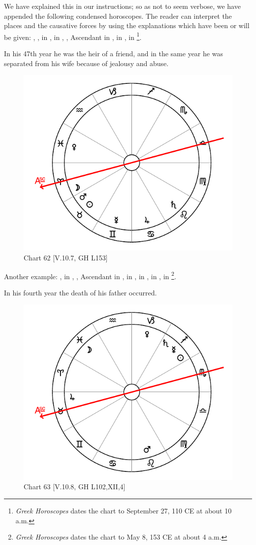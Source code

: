 \noindent We have explained this in our instructions; so as not to seem verbose, we have appended the following condensed horoscopes. The reader can interpret the places and the causative forces by using the
explanations which have been or will be given: \Sun, \Mercury, \Venus \xspace in \Libra, \Saturn\xspace in \Aquarius, \Jupiter, Ascendant in \Sagittarius, \Mars\xspace in \Virgo, \Moon in \Leo\footnote{\textit{Greek Horoscopes} dates the chart to September 27, 110 CE at about 10 a.m.}. 

In his 47th year he was the heir of a friend, and in the same year he was separated from his wife because of jealousy and abuse.

\begin{figure}
\centering
\vspace{-20pt}
\includegraphics[width=.68\textwidth]{charts/5_10_07}
\caption{Chart 62 [V.10.7, GH L153]}
\label{fig:chart62}
\end{figure}

\noindent Another example: \Sun, \Mars\xspace in \Taurus, \Moon, Ascendant in \Aries, \Saturn\xspace in \Leo, \Jupiter\xspace in \Cancer, \Venus\xspace in \Pisces, \Mercury\xspace in \Gemini\footnote{\textit{Greek Horoscopes} dates the chart to May 8, 153 CE at about 4 a.m.}. 

In his fourth year the death of his father occurred.

\vspace{1.2cm}

\begin{figure}
\centering
\vspace{-20pt}
\includegraphics[width=.68\textwidth]{charts/5_10_08}
\caption{Chart 63 [V.10.8, GH L102,XII,4]}
\label{fig:chart63}
\end{figure}

